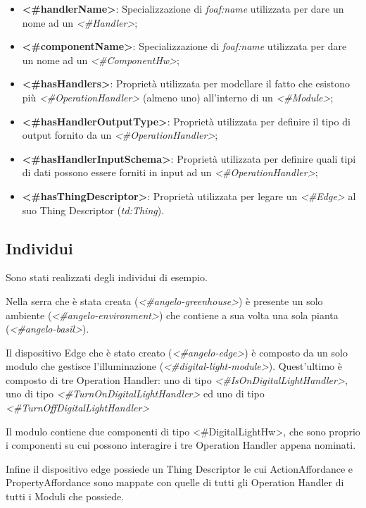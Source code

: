 \begin{itemize}
	\item \textbf{<\#handlerName>}: Specializzazione di \textit{foaf:name} utilizzata per dare un nome ad un \textit{<\#Handler>};

	\item \textbf{<\#componentName>}: Specializzazione di \textit{foaf:name} utilizzata per dare un nome ad un \textit{<\#ComponentHw>};

	\item \textbf{<\#hasHandlers>}: Proprietà utilizzata per modellare il fatto che esistono più \textit{<\#OperationHandler>} (almeno uno) all'interno di un \textit{<\#Module>};

	\item \textbf{<\#hasHandlerOutputType>}: Proprietà utilizzata per definire il tipo di output fornito da un \textit{<\#OperationHandler>};

	\item \textbf{<\#hasHandlerInputSchema>}: Proprietà utilizzata per definire quali tipi di dati possono essere forniti in input ad un \textit{<\#OperationHandler>};

	\item \textbf{<\#hasThingDescriptor>}: Proprietà utilizzata per legare un \textit{<\#Edge>} al suo Thing Descriptor (\textit{td:Thing}).
\end{itemize}

\subsection{Individui}
Sono stati realizzati degli individui di esempio.

\noindent Nella serra che è stata creata (\textit{<\#angelo-greenhouse>}) è presente un solo ambiente (\textit{<\#angelo-environment>}) che contiene a sua volta una sola pianta (\textit{<\#angelo-basil>}).

\noindent Il dispositivo Edge che è stato creato (\textit{<\#angelo-edge>}) è composto da un solo modulo che gestisce l'illuminazione (\textit{<\#digital-light-module>}). Quest'ultimo è composto di tre Operation Handler: uno di tipo \textit{<\#IsOnDigitalLightHandler>}, uno di tipo \textit{<\#TurnOnDigitalLightHandler>} ed uno di tipo \textit{<\#TurnOffDigitalLightHandler>}

\noindent Il modulo contiene due componenti di tipo <\#DigitalLightHw>, che sono proprio i componenti su cui possono interagire i tre Operation Handler appena nominati.

\noindent Infine il dispositivo edge possiede un Thing Descriptor le cui ActionAffordance e PropertyAffordance sono mappate con quelle di tutti gli Operation Handler di tutti i Moduli che possiede.
